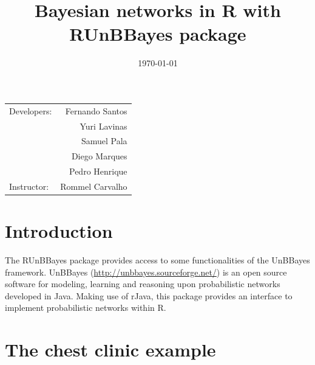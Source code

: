 \documentclass[a4paper]{article}
\title{Bayesian networks in R with RUnBBayes package} %
\date{\today} %
\begin{document}


\maketitle %

\begin{center}
\begin{tabular}{l r}
Developers: & Fernando Santos \\ %
& Yuri Lavinas \\
& Samuel Pala \\
& Diego Marques \\
& Pedro Henrique \\
Instructor: & Rommel Carvalho %
\end{tabular}
\end{center}



\section{Introduction}

The RUnBBayes package provides access to some functionalities of the UnBBayes framework. UnBBayes (\url{http://unbbayes.sourceforge.net/}) is an open source software for modeling, learning and reasoning upon probabilistic networks developed in Java. Making use of rJava, this package provides an interface to implement probabilistic networks within R.




\section{The chest clinic example}
\end{document}
